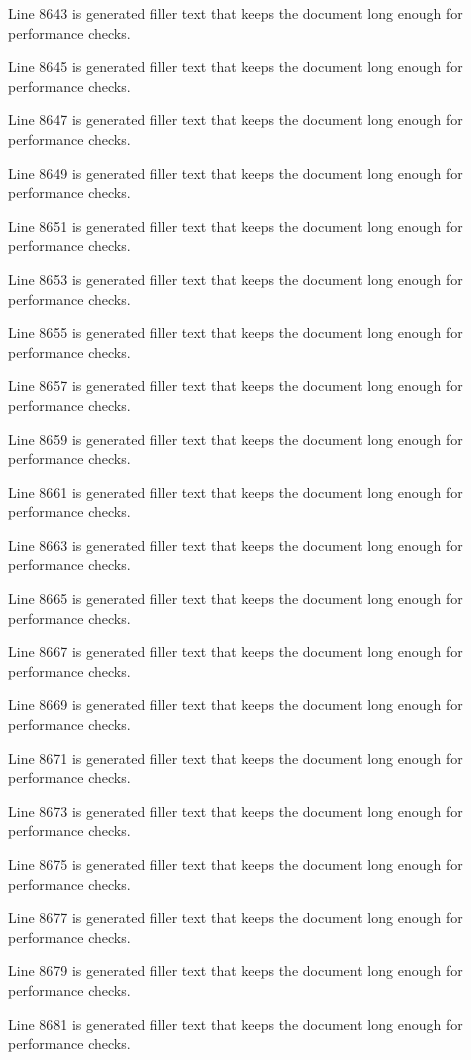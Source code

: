 Line 8643 is generated filler text that keeps the document long enough for performance checks.

Line 8645 is generated filler text that keeps the document long enough for performance checks.

Line 8647 is generated filler text that keeps the document long enough for performance checks.

Line 8649 is generated filler text that keeps the document long enough for performance checks.

Line 8651 is generated filler text that keeps the document long enough for performance checks.

Line 8653 is generated filler text that keeps the document long enough for performance checks.

Line 8655 is generated filler text that keeps the document long enough for performance checks.

Line 8657 is generated filler text that keeps the document long enough for performance checks.

Line 8659 is generated filler text that keeps the document long enough for performance checks.

Line 8661 is generated filler text that keeps the document long enough for performance checks.

Line 8663 is generated filler text that keeps the document long enough for performance checks.

Line 8665 is generated filler text that keeps the document long enough for performance checks.

Line 8667 is generated filler text that keeps the document long enough for performance checks.

Line 8669 is generated filler text that keeps the document long enough for performance checks.

Line 8671 is generated filler text that keeps the document long enough for performance checks.

Line 8673 is generated filler text that keeps the document long enough for performance checks.

Line 8675 is generated filler text that keeps the document long enough for performance checks.

Line 8677 is generated filler text that keeps the document long enough for performance checks.

Line 8679 is generated filler text that keeps the document long enough for performance checks.

Line 8681 is generated filler text that keeps the document long enough for performance checks.

